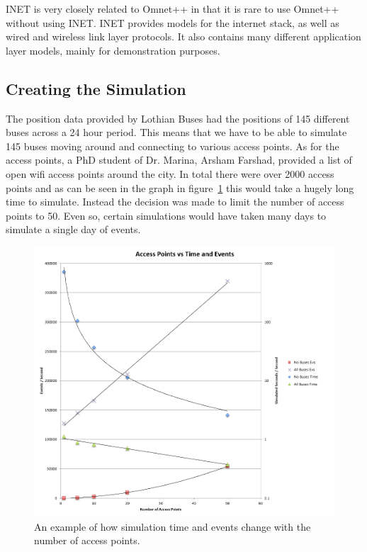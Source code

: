 \documentclass[12pt,a4paper,notitlepage]{article}
\begin{document}
INET is very closely related to Omnet++ in that it is rare to use Omnet++ without using INET. INET provides models for the internet stack, as well as wired and wireless link layer protocols. It also contains many different application layer models, mainly for demonstration purposes.  

\subsection{Creating the Simulation}

The position data provided by Lothian Buses had the positions of 145 different buses across a 24 hour period. This means that we have to be able to simulate 145 buses moving around and connecting to various access points. As for the access points, a PhD student of Dr. Marina, Arsham Farshad, provided a list of open wifi access points around the city. In total there were over 2000 access points and as can be seen in the graph in figure~\ref{fig:aptimes} this would take a hugely long time to simulate. Instead the decision was made to limit the number of access points to 50. Even so, certain simulations would have taken many days to simulate a single day of events. 

\begin{figure}[H]
    \begin{center}
        \includegraphics[width=\textwidth]{../images/AP_vs_Time_and_Events.png}
        \caption{An example of how simulation time and events change with the number of access points.}
        \label{fig:aptimes}
    \end{center}
\end{figure}
\end{document}
